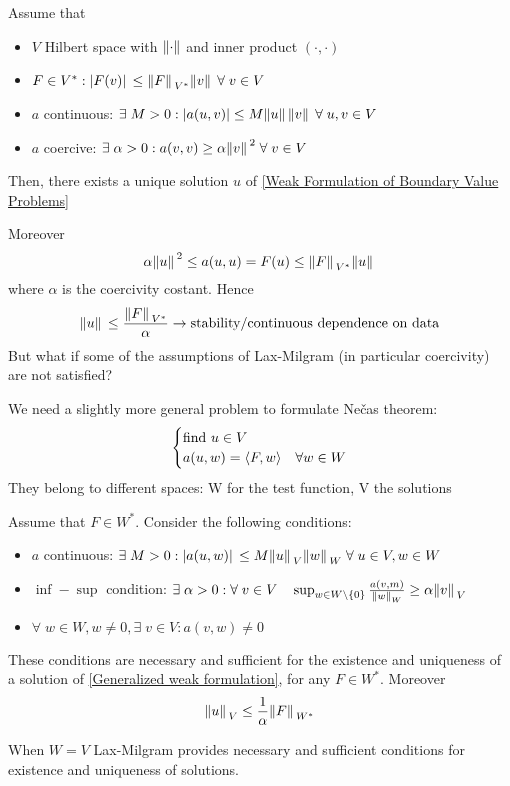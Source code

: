 \begin{theorem}
    Assume that 
    \begin{itemize}
        \item \(V\) Hilbert space with \(\norm{\cdot}\) and inner product \((\cdot, \cdot)\)
        \item \(F \in V^*: \abs*{F(v)} \leq \norm*{F}_{V^*}\norm*{v} \; \forall \; v \in V\)
        \item \(a\) continuous: \(\exists \; M > 0: \abs{a(u,v)} \leq M \norm*{u}\norm*{v} \; \forall \; u,v \in V\)
        \item \(a\) coercive: \(\exists \; \alpha > 0: a(v,v) \geq \alpha\norm*{v}^2 \; \forall \; v \in V\)
    \end{itemize}
    Then, there exists a unique solution \(u\) of \ref*{Weak Formulation of Boundary Value Problems}
\end{theorem}
Moreover 
\[
    \alpha \norm*{u}^2 \leq a(u,u) = F(u) \leq \norm*{F}_{V^*} \norm*{u}
\]
where \(\alpha\) is the coercivity costant. Hence
\[
    \norm*{u} \leq \frac{\norm*{F}_{V^*}}{\alpha} \to \text{stability/continuous dependence on data}
\]
But what if some of the assumptions of Lax-Milgram (in particular coercivity) are not satisfied?

We need a slightly more general problem to formulate Nečas theorem:
\begin{equation}
    \begin{cases}
        \text{find } u \in V \\
        a(u,w) = \langle F,w \rangle & \forall w \in W \label{Generalized weak formulation}
    \end{cases}
\end{equation}
They belong to different spaces: W for the test function, V the solutions
\begin{theorem}[Nečas]
    Assume that \(F \in W^*\). Consider the following conditions:
    \begin{itemize}
        \item \(a\) continuous: \(\exists \; M > 0: \abs*{a(u,w)} \leq M \norm*{u}_V \norm*{w}_W \; \forall \; u \in V, w \in W\)
        \item \(\inf-\sup\) condition: \(\exists \; \alpha > 0: \forall \; v \in V \quad \sup_{w \in W \setminus \left\{0\right\}} \frac{a(v,m)}{\norm*{w}_W} \geq \alpha \norm*{v}_V\)
        \item \(\forall \; w \in W, w \neq 0, \exists \; v \in V : a(v,w) \neq 0\)
    \end{itemize}
    These conditions are necessary and sufficient for the existence and uniqueness of a solution of \ref*{Generalized weak formulation}, for any \(F \in W^*\). Moreover 
    \[
        \norm*{u}_V \leq \frac{1}{\alpha}\norm*{F}_{W^*}
    \]
\end{theorem}
When \(W=V\) Lax-Milgram provides necessary and sufficient conditions for existence and uniqueness of solutions.

